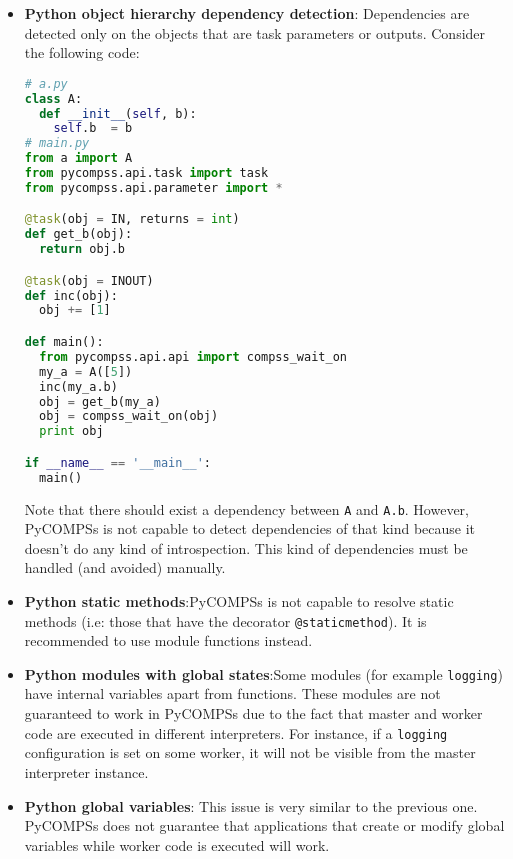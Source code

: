 \begin{itemize}
\item \textbf{Python object hierarchy dependency detection}: \newline Dependencies are detected only on the objects that are task 
parameters or outputs. Consider the following code:
\begin{lstlisting}[language=python]
# a.py
class A:
  def __init__(self, b):
    self.b  = b
# main.py
from a import A
from pycompss.api.task import task
from pycompss.api.parameter import *

@task(obj = IN, returns = int)
def get_b(obj):
  return obj.b

@task(obj = INOUT)
def inc(obj):
  obj += [1]

def main():
  from pycompss.api.api import compss_wait_on
  my_a = A([5])
  inc(my_a.b)
  obj = get_b(my_a)
  obj = compss_wait_on(obj)
  print obj

if __name__ == '__main__':
  main()            
\end{lstlisting}
Note that there should exist a dependency between \verb|A| and \verb|A.b|. However, PyCOMPSs is not capable
to detect dependencies of that kind because it doesn't do any kind of introspection. This kind of dependencies
must be handled (and avoided) manually.

\item \textbf{Python static methods}:\newline PyCOMPSs is not capable to resolve static methods (i.e: those that have the decorator
\verb|@staticmethod|). It is recommended to use module functions
instead.

\item \textbf{Python modules with global states}:\newline Some modules (for example \verb|logging|) have internal variables apart from functions. 
These modules are not guaranteed to work in PyCOMPSs due to the fact that master and worker code are executed in different interpreters. For instance, if a \verb|logging| configuration is set on some
worker, it will not be visible from the master interpreter instance.

\item \textbf{Python global variables}:\newline
This issue is very similar to the previous one. PyCOMPSs does not guarantee that applications that create or modify global variables while
worker code is executed will work.


\end{itemize}
